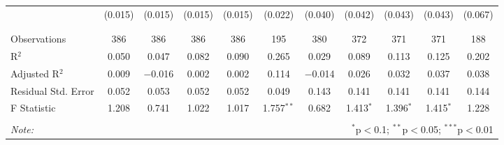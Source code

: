 \begin{table}[H]
\begin{tabular}{@{\extracolsep{4pt}}lcccccccccc}
  & (0.015) & (0.015) & (0.015) & (0.015) & (0.022) & (0.040) & (0.042) & (0.043) & (0.043) & (0.067) \\ 
  & & & & & & & & & & \\ 
\hline \\[-1.8ex] 
Observations & 386 & 386 & 386 & 386 & 195 & 380 & 372 & 371 & 371 & 188 \\ 
R$^{2}$ & 0.050 & 0.047 & 0.082 & 0.090 & 0.265 & 0.029 & 0.089 & 0.113 & 0.125 & 0.202 \\ 
Adjusted R$^{2}$ & 0.009 & $-$0.016 & 0.002 & 0.002 & 0.114 & $-$0.014 & 0.026 & 0.032 & 0.037 & 0.038 \\ 
Residual Std. Error & 0.052 & 0.053 & 0.052 & 0.052 & 0.049 & 0.143 & 0.141 & 0.141 & 0.141 & 0.144 \\ 
F Statistic & 1.208 & 0.741 & 1.022 & 1.017 & 1.757$^{**}$ & 0.682 & 1.413$^{*}$ & 1.396$^{*}$ & 1.415$^{*}$ & 1.228 \\ 
\hline 
\hline \\[-1.8ex] 
\textit{Note:}  & \multicolumn{10}{r}{$^{*}$p$<$0.1; $^{**}$p$<$0.05; $^{***}$p$<$0.01} \\ 
\end{tabular} 
\end{table} 
